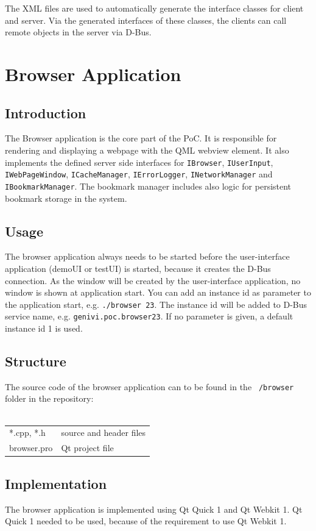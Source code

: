 \documentclass{pelagicore}
\begin{document}
The XML files are used to automatically generate the interface classes for
client and server. Via the generated interfaces of these classes, the clients
can call remote objects in the server via D-Bus.

\section{Browser Application}
\subsection{Introduction}
The Browser application is the core part of the PoC. It is responsible for
rendering and displaying a webpage with the QML webview element. It also
implements the defined server side interfaces for \texttt{IBrowser}, {\tt IUserInput},
{\tt IWebPageWindow}, {\tt ICacheManager}, {\tt IErrorLogger}, {\tt INetworkManager} and {\tt IBookmarkManager}. The bookmark manager includes also
logic for persistent bookmark storage in the system.

\subsection{Usage}
The browser application always needs to be started before the user-interface
application (demoUI or testUI) is started, because it creates the D-Bus
connection. As the window will be created by the user-interface application, no
window is shown at application start.  You can add an instance id as parameter
to the application start, e.g. {\tt ./browser 23}. The instance id will be
added to D-Bus service name, e.g. {\tt genivi.poc.browser23}. If no parameter
is given, a default instance id 1 is used.

\subsection{Structure}
The source code of the browser application can to be found in the {\tt
/browser} folder in the repository:
\\\\
\begin{tabular}{l l}
    *.cpp, *.h         & source and header files \\
    browser.pro        & Qt project file
\end{tabular}

\subsection{Implementation}
The browser application is implemented using Qt Quick 1 and Qt Webkit 1. Qt
Quick 1 needed to be used, because of the requirement to use Qt Webkit 1.
\end{document}

